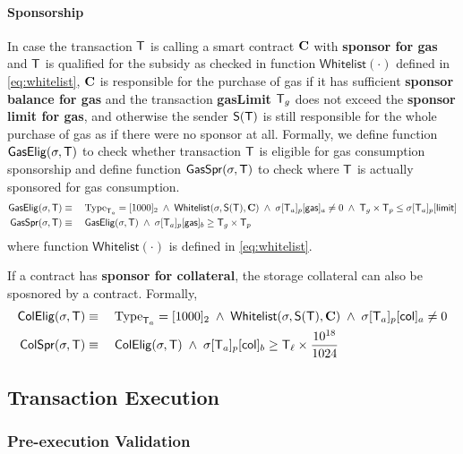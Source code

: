 \paragraph{Sponsorship}

In case the transaction $\textsf{T}$ is calling a smart contract $\mathbf{C}$ with \textbf{sponsor for gas} and $\textsf{T}$ is qualified for the subsidy as checked in function $\mathsf{Whitelist}(\cdot)$ defined in \cref{eq:whitelist}, 
$\mathbf{C}$ is responsible for the purchase of gas if it has sufficient \textbf{sponsor balance for gas}
and the transaction \textbf{gasLimit} $\textsf{T}_g$ does not exceed the {\bf sponsor limit for gas}, 
and otherwise the sender $\mathsf{S}{\left({\textsf{T}} \right)}$ is still responsible for the whole purchase of gas as if there were no sponsor at all. 
%
Formally, we define function $\mathsf{GasElig}(\mathbf{\sigma},\textsf{T})$ to check whether transaction $\textsf{T}$ is eligible for gas consumption sponsorship and define function $\mathsf{GasSpr}(\mathbf{\sigma},\textsf{T})$ to check where $\textsf{T}$ is actually sponsored for gas consumption. 
\begin{align}
	\mathsf{GasElig}(\mathbf{\sigma},\textsf{T})&\equiv \quad \mathrm{Type}_{\textsf{T}_a}=[1000]_2 \;\wedge\; \mathsf{Whitelist}(\mathbf{\sigma},\mathsf{S}{\left({\textsf{T}} \right)},\mathbf{C}) \;\wedge\; \mathbf{\sigma}[\textsf{T}_a]_p[\mathsf{gas}]_a\neq 0 \;\wedge\; \textsf{T}_g\times\textsf{T}_p \le \mathbf{\sigma}[\textsf{T}_a]_p[\mathsf{limit}] \\
	\mathsf{GasSpr}(\mathbf{\sigma},\textsf{T}) &\equiv\quad  \mathsf{GasElig}(\mathbf{\sigma},\textsf{T}) \;\wedge\; \mathbf{\sigma}[\textsf{T}_a]_p[{\sf gas}]_b\ge \textsf{T}_g\times\textsf{T}_p
\end{align}
%
where function $\mathsf{Whitelist}(\cdot)$ is defined in \cref{eq:whitelist}. 

If a contract has \textbf{sponsor for collateral}, the storage collateral can also be sposnored by a contract. Formally,
\begin{align}
	\mathsf{ColElig}(\mathbf{\sigma},\textsf{T}) &\equiv \quad \mathrm{Type}_{\textsf{T}_a}=[1000]_2 \;\wedge\; \mathsf{Whitelist}(\mathbf{\sigma},\mathsf{S}{\left({\textsf{T}} \right)},\mathbf{C}) \;\wedge\; \mathbf{\sigma}[\textsf{T}_a]_p[\mathsf{col}]_a\neq 0 \\
	\mathsf{ColSpr}(\mathbf{\sigma},\textsf{T}) &\equiv\quad  \mathsf{ColElig}(\mathbf{\sigma},\textsf{T}) \;\wedge\; \mathbf{\sigma}[\textsf{T}_a]_p[{\sf col}]_b\ge \textsf{T}_\ell\times \frac{10^{18}}{1024}
\end{align}

\subsection{Transaction Execution}

\subsubsection{Pre-execution Validation}
\label{sec:tx validate}

